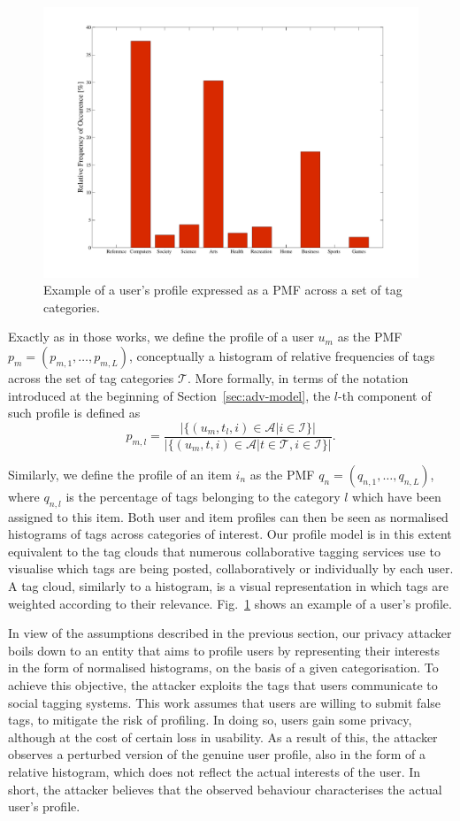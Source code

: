 \begin{figure}[htb]
\includegraphics[width=\textwidth]{figures/UPRel.pdf}
\caption[User PMF.]{Example of a user's profile expressed as a PMF across a set of tag categories.
\label{fig:UserProfile}}
\end{figure}

Exactly as in those works, we define the profile of a user $u_m$ as the PMF $p_m = (p_{m,1},\ldots, p_{m,L})$, conceptually a histogram of relative frequencies of tags across the set of tag categories $\mathcal{T}$. More formally, in terms of the notation introduced at the beginning of Section~\ref{sec:adv-model}, the $l$-th component of such profile is defined as
$$p_{m,l} = \frac{|\{(u_m,t_l,i)\in\mathcal{A} | i\in\mathcal{I}\}|}{|\{(u_m,t,i)\in\mathcal{A} | t\in\mathcal{T}, i\in\mathcal{I}\}|}.$$

Similarly, we define the profile of an item $i_n$ as the PMF $q_n =(q_{n,1},\ldots, q_{n,L})$, where $q_{n,l}$ is the percentage of tags belonging to the category $l$ which have been assigned to this item. Both user and item profiles can then be seen as normalised histograms of tags across categories of interest. Our profile model is in this extent equivalent to the tag clouds that numerous collaborative tagging services use to visualise which tags are being posted, collaboratively or individually by each user. A tag cloud, similarly to a histogram, is a visual representation in which tags are weighted according to their relevance. Fig.~\ref{fig:UserProfile} shows an example of a user's profile.

In view of the assumptions described in the previous section, our privacy attacker boils down to an entity that aims to profile users by representing their interests in the form of normalised histograms, on the basis of a given categorisation.
To achieve this objective, the attacker exploits the tags that users communicate to social tagging systems. This work assumes that users are willing to submit false tags, to mitigate the risk of profiling. In doing so, users gain some privacy, although at the cost of certain loss in usability. As a result of this, the attacker observes a perturbed version of the genuine user profile, also in the form of a relative histogram, which does not reflect the actual interests of the user. In short, the attacker believes that the observed behaviour characterises the actual user's profile.

